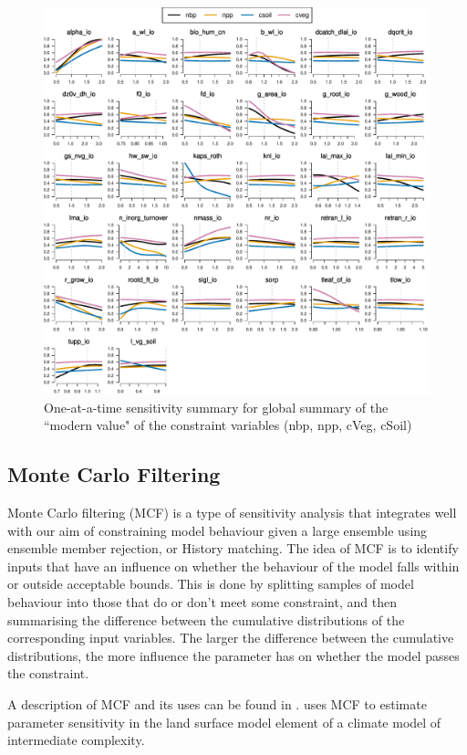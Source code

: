 \documentclass[gmd, manuscript]{copernicus}
\begin{document}
\begin{figure}[t]
\includegraphics[width=12cm]{./figs/Y_oaat_const_level1a_wave01_scaled_norm}
\caption{One-at-a-time sensitivity summary for global summary of the ``modern value" of the constraint variables (nbp, npp, cVeg, cSoil)}
\label{fig:Y_oaat_const_level1a_wave01_scaled_norm}
\end{figure}


\subsection{Monte Carlo Filtering}\label{ssec:sa_MCF}

Monte Carlo filtering (MCF) is a type of sensitivity analysis that integrates well with our aim of constraining model behaviour given a large ensemble using ensemble member rejection, or History matching. The idea of MCF is to identify inputs that have an influence on whether the behaviour of the model falls within or outside acceptable bounds. This is done by splitting samples of model behaviour into those that do or don't meet some constraint, and then summarising the difference between the cumulative distributions of the corresponding input variables. The larger the difference between the cumulative distributions, the more influence the parameter has on whether the model passes the constraint.

A description of MCF and its uses can be found in \cite{pianosi2016sensitivity}. \cite{mcneall2020correcting} uses MCF to estimate parameter sensitivity in the land surface model element of a climate model of intermediate complexity.
\end{document}
